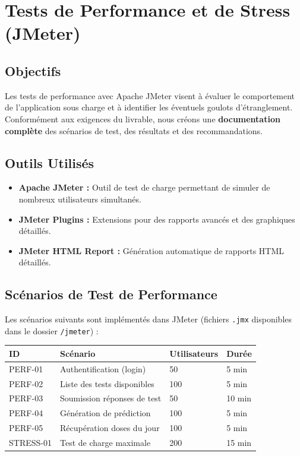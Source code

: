\documentclass[12pt,a4paper]{report}
\begin{document}
\section{Tests de Performance et de Stress (JMeter)}

\subsection{Objectifs}

Les tests de performance avec Apache JMeter visent à évaluer le comportement de l'application sous charge et à identifier les éventuels goulots d'étranglement. Conformément aux exigences du livrable, nous créons une \textbf{documentation complète} des scénarios de test, des résultats et des recommandations.

\subsection{Outils Utilisés}

\begin{itemize}
    \item \textbf{Apache JMeter :} Outil de test de charge permettant de simuler de nombreux utilisateurs simultanés.
    
    \item \textbf{JMeter Plugins :} Extensions pour des rapports avancés et des graphiques détaillés.
    
    \item \textbf{JMeter HTML Report :} Génération automatique de rapports HTML détaillés.
\end{itemize}

\subsection{Scénarios de Test de Performance}

Les scénarios suivants sont implémentés dans JMeter (fichiers \texttt{.jmx} disponibles dans le dossier \texttt{/jmeter}) :

\begin{center}
\begin{tabular}{|l|l|l|l|}
    \hline
    \textbf{ID} & \textbf{Scénario} & \textbf{Utilisateurs} & \textbf{Durée} \\
    \hline
    PERF-01 & Authentification (login) & 50 & 5 min \\
    \hline
    PERF-02 & Liste des tests disponibles & 100 & 5 min \\
    \hline
    PERF-03 & Soumission réponses de test & 50 & 10 min \\
    \hline
    PERF-04 & Génération de prédiction & 100 & 5 min \\
    \hline
    PERF-05 & Récupération doses du jour & 100 & 5 min \\
    \hline
    STRESS-01 & Test de charge maximale & 200 & 15 min \\
    \hline
\end{tabular}
\end{center}
\end{document}
